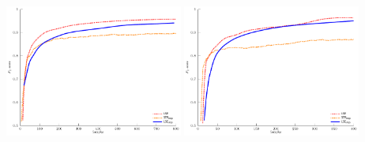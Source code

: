 \documentclass[10pt,mathserif,serif,handout]{beamer}
\begin{document}
\begin{frame}
\begin{center}
\includegraphics[width=2.3in]{figures/ev_chl_imp}
\includegraphics[width=2.3in]{figures/ev_bgape_imp}
\end{center}
\end{frame}
\end{document}
